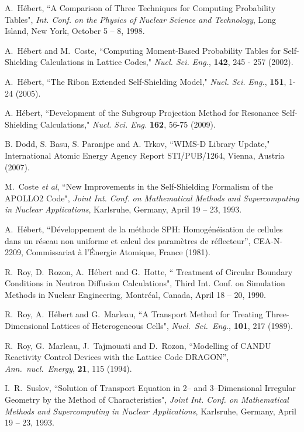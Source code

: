 \begin{thebibliography}{99}
A.~H\'ebert, ``A Comparison of Three Techniques for Computing Probability
Tables", {\sl Int. Conf. on the Physics of Nuclear Science and Technology},
Long Island, New York, October 5 -- 8, 1998.

A.~H\'ebert and M.~Coste, ``Computing Moment-Based Probability Tables for
Self-Shielding Calculations in Lattice Codes," {\sl Nucl. Sci. Eng.}, {\bf 142},
245 - 257 (2002).

A.~H\'ebert, ``The Ribon Extended Self-Shielding Model," {\sl Nucl. Sci. Eng.}, {\bf 151}, 1-24  (2005).

A. H\'ebert, ``Development of the Subgroup Projection Method for Resonance Self-Shielding Calculations," {\sl Nucl. Sci. Eng.} {\bf 162}, 56-75 (2009).

B. Dodd, S. Basu, S. Paranjpe and A. Trkov, ``WIMS-D Library Update," International Atomic Energy Agency
Report STI/PUB/1264, Vienna, Austria (2007).

M.~Coste {\sl et al}, ``New Improvements in the Self-Shielding Formalism of the APOLLO2
Code", {\sl Joint Int. Conf. on
Mathematical Methods and Supercomputing in Nuclear Applications}, Karlsruhe,
Germany, April 19 -- 23, 1993.

A.~H\'ebert, ``D\'eveloppement de la m\'ethode SPH: Homog\'en\'eisation de
cellules dans un r\'eseau non uniforme  et calcul des param\`etres de
r\'eflecteur'', CEA-N-2209, Commissariat \`a l'\'Energie Atomique, France (1981).

R.~Roy, D.~Rozon, A.~H\'ebert and G.~Hotte, `` Treatment of Circular Boundary
Conditions in Neutron Diffusion Calculations", Third Int. Conf. on Simulation
Methods in Nuclear Engineering, Montr\'eal, Canada, April 18 -- 20,
1990.

R.~Roy, A.~H\'ebert and G.~Marleau, ``A Transport Method for Treating
Three-Dimensional Lattices of Heterogeneous Cells", {\sl Nucl.~Sci.~Eng.}, {\bf
101}, 217 (1989).

 R.~Roy, G.~Marleau, J.~Tajmouati and D.~Rozon, ``Modelling of CANDU Reactivity
Control Devices with the Lattice Code DRAGON'', {\sl Ann.~nucl.~Energy}, {\bf
21}, 115 (1994).

I.~R.~Suslov, ``Solution of Transport Equation in 2-- and 3--Dimensional
Irregular Geometry by the Method of Characteristics", {\sl Joint Int. Conf. on
Mathematical Methods and Supercomputing in Nuclear Applications}, Karlsruhe,
Germany, April 19 -- 23, 1993.


\end{thebibliography}
